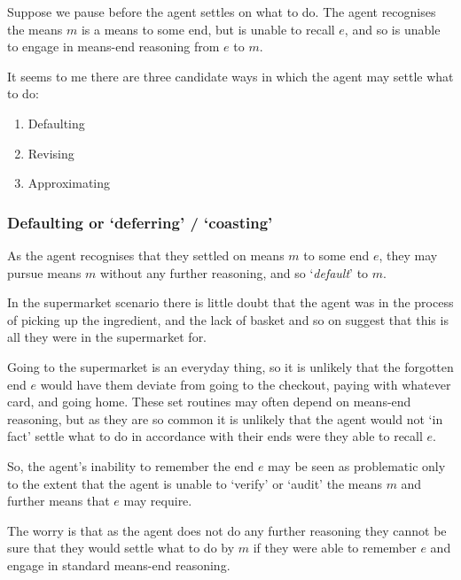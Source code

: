 \documentclass[10pt]{article}
\newcommand{\hozline}[0]{%
  \noindent\hdashrule[0.5ex][c]{\textwidth}{.1pt}{}
}
\begin{document}

Suppose we pause before the agent settles on what to do.
The agent recognises the means \(m\) is a means to some end, but is unable to recall \(e\), and so is unable to engage in means-end reasoning from \(e\) to \(m\).

It seems to me there are three candidate ways in which the agent may settle what to do:

\begin{enumerate}[label=\Alph*.]
\item Defaulting
\item Revising
\item Approximating
\end{enumerate}

\hozline

\subsubsection*{Defaulting \hfill or `deferring' / `coasting'}
\label{sec:defaulting}

As the agent recognises that they settled on means \(m\) to some end \(e\), they may pursue means \(m\) without any further reasoning, and so `\emph{default}' to \(m\).

In the supermarket scenario there is little doubt that the agent was in the process of picking up the ingredient, and the lack of basket and so on suggest that this is all they were in the supermarket for.

Going to the supermarket is an everyday thing, so it is unlikely that the forgotten end \(e\) would have them deviate from going to the checkout, paying with whatever card, and going home.
These set routines may often depend on means-end reasoning, but as they are so common it is unlikely that the agent would not `in fact' settle what to do in accordance with their ends were they able to recall \(e\).

So, the agent's inability to remember the end \(e\) may be seen as problematic only to the extent that the agent is unable to `verify' or `audit' the means \(m\) and further means that \(e\) may require.

The worry is that as the agent does not do any further reasoning they cannot be sure that they would settle what to do by \(m\) if they were able to remember \(e\) and engage in standard means-end reasoning.
\end{document}
